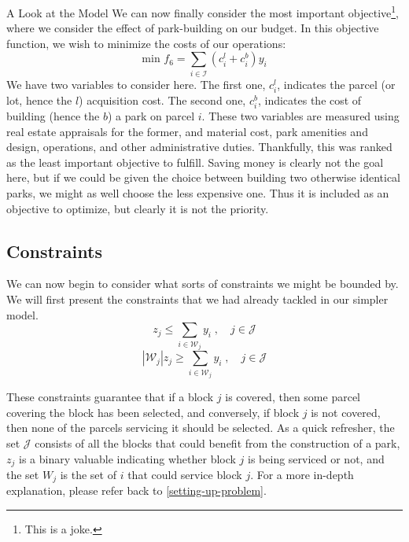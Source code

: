 \documentclass[12pt]{pom_thesis}
\theoremstyle{definition}
\begin{document}
\begin{chapter}{A Look at the Model}
We can now finally consider the most important objective\footnote{This is a joke.}, where we consider the effect of park-building on our budget. In this objective function, we wish to minimize the costs of our operations:
\begin{equation} \label{objective-6}
\textrm{min } f_6 = \sum_{i \in \mathcal{I}} (c_i^l + c_i^b)y_i
\end{equation}
We have two variables to consider here. The first one, $c_i^l$, indicates the parcel (or lot, hence the $l$) acquisition cost. The second one, $c_i^b$, indicates the cost of building (hence the $b$) a park on parcel $i$. These two variables are measured using real estate appraisals for the former, and material cost, park amenities and design, operations, and other administrative duties. Thankfully, this was ranked as the least important objective to fulfill. Saving money is clearly not the goal here, but if we could be given the choice between building two otherwise identical parks, we might as well choose the less expensive one. Thus it is included as an objective to optimize, but clearly it is not the priority. \\

%
%
\subsection{Constraints}
We can now begin to consider what sorts of constraints we might be bounded by. We will first present the constraints that we had already tackled in our simpler model.
\begin{equation} \label{constraint-7}
z_j \leq \sum_{i \in \mathcal{W}_j} y_i \; , \quad j \in \mathcal{J}
\end{equation}
%
\begin{equation} \label{constrain-8}
\left|\mathcal{W}_j\right|z_j \geq \sum_{i \in \mathcal{W}_j} y_i \; , \quad j \in \mathcal{J}
\end{equation}

These constraints guarantee that if a block $j$ is covered, then some parcel covering the block has been selected, and conversely, if block $j$ is not covered, then none of the parcels servicing it should be selected. As a quick refresher, the set $\mathcal{J}$ consists of all the blocks that could benefit from the construction of a park, $z_j$ is a binary valuable indicating whether block $j$ is being serviced or not, and the set $W_j$ is the set of $i$ that could service block $j$. For a more in-depth explanation, please refer back to \autoref{setting-up-problem}. \\


\end{chapter}
\end{document}
